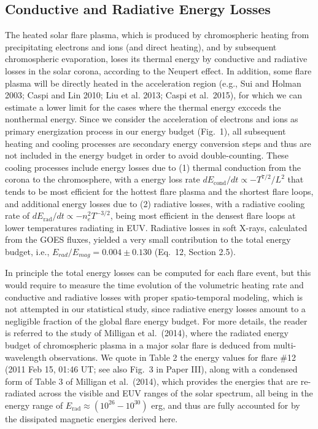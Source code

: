 \documentclass[10pt,preprint]{aastex}  %
\begin{document}
\subsection{	Conductive and Radiative Energy Losses 	}

The heated solar flare plasma, which is produced by chromospheric
heating from precipitating electrons and ions (and direct heating),
and by subsequent chromospheric evaporation, loses its thermal 
energy by conductive and radiative losses in the solar corona,
according to the Neupert effect. In addition, some flare
plasma will be directly heated in the acceleration region
(e.g., Sui and Holman 2003; Caspi and Lin 2010; 
Liu et al. 2013; Caspi et al.~2015), 
for which we can estimate a lower limit for the cases 
where the thermal energy excceds the nonthermal energy. 
Since we consider the acceleration of electrons and ions as
primary energization process in our energy budget (Fig.~1), 
all subsequent heating and cooling processes are secondary 
energy conversion steps and thus are not included in the 
energy budget in order to avoid double-counting. These cooling 
processes include energy losses due to (1) thermal conduction
from the corona to the chromosphere, with a energy loss rate
$dE_{\mathrm{cond}}/dt \propto -T^{7/2}/L^2$ that tends to be
most efficient for the hottest flare plasma and the shortest 
flare loops, and
additional energy losses due to (2) radiative losses, with
a radiative cooling rate of $dE_{\mathrm{rad}}/dt \propto -n_e^2
T^{-3/2}$, being most efficient in the densest flare loops
at lower temperatures radiating in EUV. Radiative losses
in soft X-rays, calculated from the GOES fluxes, yielded a
very small contribution to the total energy budget, i.e.,
$E_{rad}/E_{mag}=0.004\pm0.130$ (Eq.~12, Section 2.5).

In principle the
total energy losses can be computed for each flare event,
but this would require to measure the time evolution of the
volumetric heating rate and conductive and radiative losses 
with proper spatio-temporal modeling, which is not attempted
in our statistical study, since radiative energy 
losses amount to a negligible fraction of the global flare
energy budget. For more details, 
the reader is referred to the study of Milligan 
et al.~(2014), where the radiated energy budget of chromospheric
plasma in a major solar flare is deduced from multi-wavelength
observations. We quote in Table 2 the energy values for
flare \#12 (2011 Feb 15, 01:46 UT; see also Fig.~3 in Paper III),
along with a condensed form of Table 3 
of Milligan et al.~(2014), which provides the energies that
are re-radiated across the visible and EUV ranges of the
solar spectrum, all being in the energy range of
$E_{\mathrm{rad}} \approx (10^{26} - 10^{30})$ erg, 
and thus are fully accounted for by the dissipated magnetic 
energies derived here.
\end{document}
